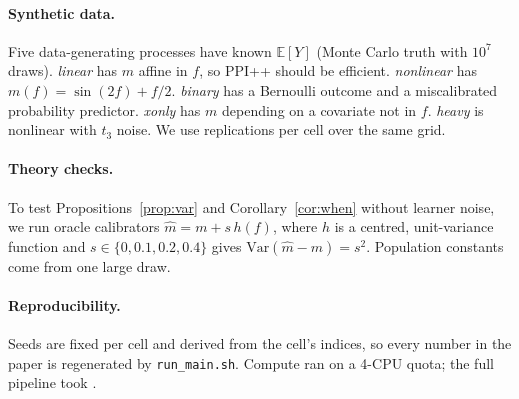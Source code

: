 \paragraph{Synthetic data.}
Five data-generating processes have known $\mathbb E[Y]$ (Monte Carlo truth with $10^7$ draws). \emph{linear} has $m$ affine in $f$, so PPI++ should be efficient. \emph{nonlinear} has $m(f)=\sin(2f)+f/2$. \emph{binary} has a Bernoulli outcome and a miscalibrated probability predictor. \emph{xonly} has $m$ depending on a covariate not in $f$. \emph{heavy} is nonlinear with $t_3$ noise. We use \REPSSYN{} replications per cell over the same grid.

\paragraph{Theory checks.}
To test Propositions~\ref{prop:var} and Corollary~\ref{cor:when} without learner noise, we run oracle calibrators $\hat m=m+s\,h(f)$, where $h$ is a centred, unit-variance function and $s\in\{0,0.1,0.2,0.4\}$ gives $\mathrm{Var}(\hat m-m)=s^2$. Population constants come from one large draw.

\paragraph{Reproducibility.}
Seeds are fixed per cell and derived from the cell's indices, so every number in the paper is regenerated by \texttt{run\_main.sh}. Compute ran on a 4-CPU quota; the full pipeline took \TOTALTIME{}.
